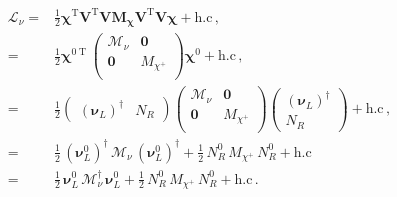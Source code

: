 \begin{align}
  \mathcal{L}_{\nu}=&\frac{1}{2} \boldsymbol{\chi}^{\operatorname{T}} \boldsymbol{V}^{\operatorname{T}} \boldsymbol{V}   \boldsymbol{M_{\chi}} \boldsymbol{V}^{\operatorname{T}} \boldsymbol{V}   \boldsymbol{\chi}+\text{h.c}\,, \nonumber\\
  =&\frac{1}{2} \boldsymbol{\chi}^{0\operatorname{T}}    \begin{pmatrix}
    \boldsymbol{\mathcal{M}}_{\nu} & \boldsymbol{0} \\
    \boldsymbol{0} & M_{\chi^{+}}\\
  \end{pmatrix} \boldsymbol{\chi}^{0}+\text{h.c}\,, \nonumber\\
  =&\frac{1}{2}
     \begin{pmatrix}
       \left( \boldsymbol{\nu}_L \right)^{\dagger}  & N_R 
     \end{pmatrix}
    \begin{pmatrix}
    \boldsymbol{\mathcal{M}}_{\nu} & \boldsymbol{0} \\
    \boldsymbol{0} & M_{\chi^{+}}\\
  \end{pmatrix}      \begin{pmatrix}
    \left( \boldsymbol{\nu}_L \right)^{\dagger} \\
    N_R 
     \end{pmatrix}
+\text{h.c}\,, \nonumber\\  
  =&\tfrac{1}{2}\,\left( \boldsymbol{\nu}_L^{0} \right)^{\dagger}\, \boldsymbol{\mathcal{M}}_{\nu}\,  \left(  \boldsymbol{\nu}_L^{0}  \right)^{\dagger}+ \tfrac{1}{2}\,{N}_R^{0}\, M_{\chi^{+}}\,    N_R^0 +\text{h.c}\nonumber\\
   =&\tfrac{1}{2}\, \boldsymbol{\nu}_L^{0} \, \boldsymbol{\mathcal{M}}_{\nu}^{\dagger}\, \boldsymbol{\nu}_L^{0} + \tfrac{1}{2}\,{N}_R^{0}\, M_{\chi^{+}}\,    N_R^0 +\text{h.c}\,.
\end{align}



